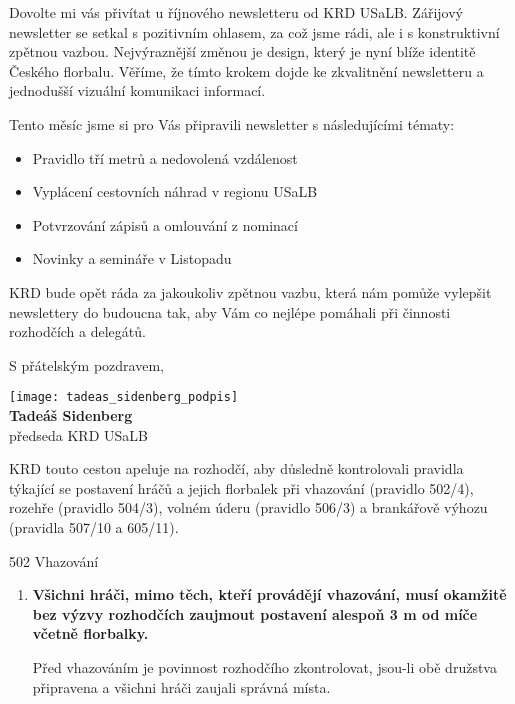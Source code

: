 \documentclass{newsletter}
\begin{document}
Dovolte mi vás přivítat u říjnového newsletteru od KRD USaLB. Zářijový newsletter se setkal s pozitivním ohlasem, za což jsme rádi, ale i s konstruktivní zpětnou vazbou. Nejvýraznější změnou je design, který je nyní blíže identitě Českého florbalu. Věříme, že tímto krokem dojde ke zkvalitnění newsletteru a jednodušší vizuální komunikaci informací.

Tento měsíc jsme si pro Vás připravili newsletter s následujícími tématy:
\begin{itemize}
	\item Pravidlo tří metrů a nedovolená vzdálenost
	\item Vyplácení cestovních náhrad v regionu USaLB
	\item Potvrzování zápisů a omlouvání z nominací
	\item Novinky a semináře v Listopadu
\end{itemize}

KRD bude opět ráda za jakoukoliv zpětnou vazbu, která nám pomůže vylepšit newslettery do budoucna tak, aby Vám co nejlépe pomáhali při činnosti rozhodčích a delegátů.

S přátelským pozdravem,

\begin{flushleft}
	\vspace{3\baselineskip}
	\texttt{[image: tadeas\_sidenberg\_podpis]}\\
	\textbf{Tadeáš Sidenberg}\\
	předseda KRD USaLB
\end{flushleft}

\pagebreak
{}
KRD touto cestou apeluje na rozhodčí, aby důsledně kontrolovali pravidla týkající se postavení hráčů a jejich florbalek při vhazování (pravidlo 502/4), rozehře (pravidlo 504/3), volném úderu (pravidlo 506/3) a brankářově výhozu (pravidla 507/10 a 605/11).

\begin{admonition-quote}{502 Vhazování}
	\begin{enumerate}\addtocounter{enumi}{3}
		\item \textbf{Všichni hráči, mimo těch, kteří provádějí vhazování, musí okamžitě bez výzvy rozhodčích zaujmout
			postavení alespoň 3 m od míče včetně florbalky.}
		
		\begin{flushleft}
			Před vhazováním je povinnost rozhodčího zkontrolovat, jsou-li obě družstva připravena a všichni hráči zaujali
			správná místa.
		\end{flushleft}
	\end{enumerate}
\end{admonition-quote}
\end{document}
